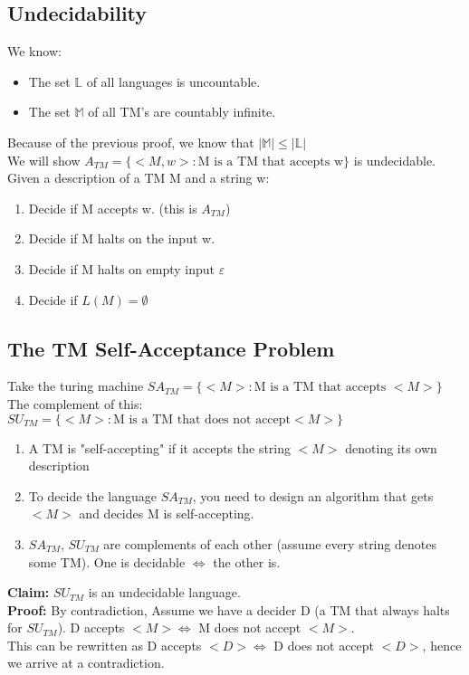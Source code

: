 \subsection{Undecidability}
We know:
\begin{itemize}
  \item The set $\mathbb{L}$ of all languages is uncountable.
  \item The set $\mathbb{M}$ of all TM's are countably infinite.
\end{itemize}
Because of the previous proof, we know that $|\mathbb{M}| \leq |\mathbb{L}|$
\\
We will show $A_{TM} = \{<M,w> : \text{M is a TM that accepts w} \}$ is undecidable. 
\\
Given a description of a TM M and a string w:
\begin{enumerate}
  \item Decide if M accepts w. (this is $A_{TM}$)
  \item Decide if M halts on the input w.
  \item Decide if M halts on empty input $\varepsilon$
  \item Decide if $L(M) = \emptyset$
\end{enumerate}

\subsection{The TM Self-Acceptance Problem}
Take the turing machine $SA_{TM} = \{<M> : \text{M is a TM that accepts }<M>\}$
\\
The complement of this: $SU_{TM} = \{<M> : \text{M is a TM that does not accept} <M> \}$
\begin{enumerate}
  \item A TM is "self-accepting" if it accepts the string $<M>$ denoting its own description
  \item To decide the language $SA_{TM}$, you need to design an algorithm that gets $<M>$ and decides M is self-accepting.
  \item $SA_{TM}$, $SU_{TM}$ are complements of each other (assume every string denotes some TM). One is decidable $\iff$ the other is.
\end{enumerate}
\begin{theorem}
  \textbf{Claim:} $SU_{TM}$ is an undecidable language.
  \\ \textbf{Proof:} By contradiction, Assume we have a decider D (a TM that always halts for $SU_{TM}$). D accepts $<M> \iff$ M does not accept $<M>$.
  \\
  This can be rewritten as D accepts $<D> \iff$ D does not accept $<D>$, hence we arrive at a contradiction.
\end{theorem}

